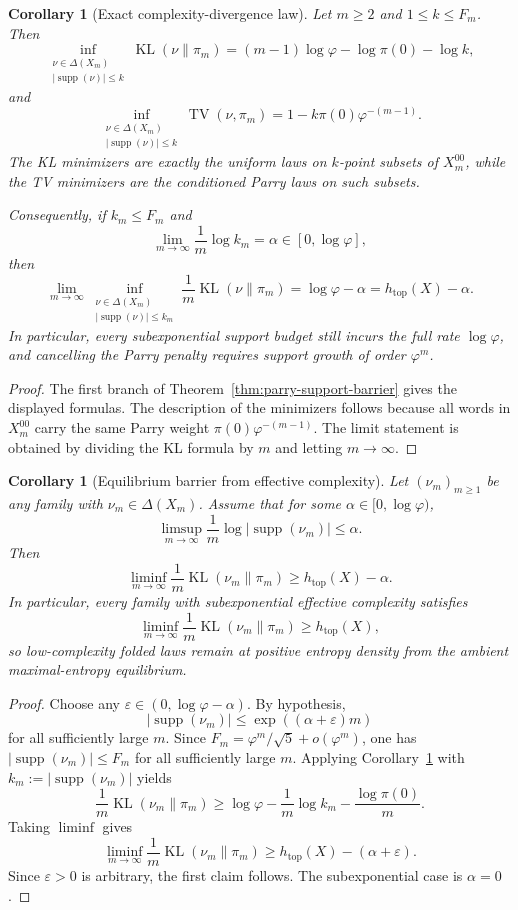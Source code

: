 \documentclass[11pt,letterpaper]{article}
\numberwithin{equation}{section}
\theoremstyle{plain}
\newtheorem{corollary}[theorem]{Corollary}
\theoremstyle{definition}
\theoremstyle{remark}
\DeclareMathOperator{\TV}{TV}
\DeclareMathOperator{\KL}{KL}
\DeclareMathOperator{\supp}{supp}
\begin{document}
\begin{corollary}[Exact complexity-divergence law]\label{cor:exact-complexity-divergence-law}
Let \(m\ge 2\) and \(1\le k\le F_m\). Then
\[
\inf_{\substack{\nu\in\Delta(X_m)\\ |\supp(\nu)|\le k}}\KL(\nu\|\pi_m)
=
(m-1)\log\varphi-\log\pi(0)-\log k,
\]
and
\[
\inf_{\substack{\nu\in\Delta(X_m)\\ |\supp(\nu)|\le k}}\TV(\nu,\pi_m)
=
1-k\pi(0)\varphi^{-(m-1)}.
\]
The KL minimizers are exactly the uniform laws on \(k\)-point subsets of
\(X_m^{00}\), while the TV minimizers are the conditioned Parry laws on such
subsets.

Consequently, if \(k_m\le F_m\) and
\[
\lim_{m\to\infty}\frac{1}{m}\log k_m=\alpha\in[0,\log\varphi],
\]
then
\[
\lim_{m\to\infty}
\inf_{\substack{\nu\in\Delta(X_m)\\ |\supp(\nu)|\le k_m}}
\frac{1}{m}\KL(\nu\|\pi_m)
=
\log\varphi-\alpha
=
h_{\mathrm{top}}(X)-\alpha.
\]
In particular, every subexponential support budget still incurs the full rate
\(\log\varphi\), and cancelling the Parry penalty requires support growth of
order \(\varphi^m\).
\end{corollary}

\begin{proof}
The first branch of Theorem~\ref{thm:parry-support-barrier} gives the displayed
formulas. The description of the minimizers follows because all words in
\(X_m^{00}\) carry the same Parry weight \(\pi(0)\varphi^{-(m-1)}\). The limit
statement is obtained by dividing the KL formula by \(m\) and letting
\(m\to\infty\).
\end{proof}

\begin{corollary}[Equilibrium barrier from effective complexity]\label{cor:equilibrium-barrier-effective-complexity}
Let \((\nu_m)_{m\ge 1}\) be any family with \(\nu_m\in\Delta(X_m)\). Assume
that for some \(\alpha\in[0,\log\varphi)\),
\[
\limsup_{m\to\infty}\frac{1}{m}\log |\supp(\nu_m)|\le \alpha.
\]
Then
\[
\liminf_{m\to\infty}\frac{1}{m}\KL(\nu_m\|\pi_m)\ge h_{\mathrm{top}}(X)-\alpha.
\]
In particular, every family with subexponential effective complexity satisfies
\[
\liminf_{m\to\infty}\frac{1}{m}\KL(\nu_m\|\pi_m)\ge h_{\mathrm{top}}(X),
\]
so low-complexity folded laws remain at positive entropy density from the
ambient maximal-entropy equilibrium.
\end{corollary}

\begin{proof}
Choose any \(\varepsilon\in(0,\log\varphi-\alpha)\). By hypothesis,
\[
|\supp(\nu_m)|\le \exp((\alpha+\varepsilon)m)
\]
for all sufficiently large \(m\). Since \(F_m=\varphi^m/\sqrt5+o(\varphi^m)\),
one has \(|\supp(\nu_m)|\le F_m\) for all sufficiently large \(m\). Applying
Corollary~\ref{cor:exact-complexity-divergence-law} with
\(k_m:=|\supp(\nu_m)|\) yields
\[
\frac{1}{m}\KL(\nu_m\|\pi_m)
\ge
\log\varphi-\frac{1}{m}\log k_m-\frac{\log\pi(0)}{m}.
\]
Taking \(\liminf\) gives
\[
\liminf_{m\to\infty}\frac{1}{m}\KL(\nu_m\|\pi_m)
\ge
h_{\mathrm{top}}(X)-(\alpha+\varepsilon).
\]
Since \(\varepsilon>0\) is arbitrary, the first claim follows. The
subexponential case is \(\alpha=0\).
\end{proof}
\end{document}
